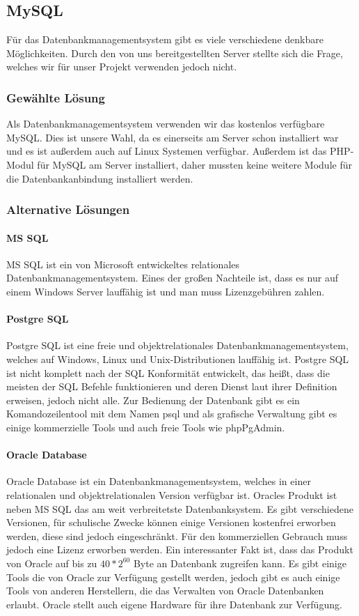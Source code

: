 \subsection{MySQL}
Für das Datenbankmanagementsystem gibt es viele verschiedene denkbare Möglichkeiten. Durch den von uns bereitgestellten Server stellte sich die Frage, welches wir für unser Projekt verwenden jedoch nicht.
\subsubsection{Gewählte Lösung}
Als Datenbankmanagementsystem verwenden wir das kostenlos verfügbare MySQL. Dies ist unsere Wahl, da es einerseits am Server schon installiert war und es ist außerdem auch auf Linux Systemen verfügbar. Außerdem ist das PHP-Modul für MySQL am Server installiert, daher mussten keine weitere Module für die Datenbankanbindung installiert werden.
\subsubsection{Alternative Lösungen} 
\paragraph{MS SQL}
MS SQL ist ein von Microsoft entwickeltes relationales Datenbankmanagementsystem. Eines der großen Nachteile ist, dass es nur auf einem Windows Server lauffähig ist und man muss Lizenzgebühren zahlen.
\paragraph{Postgre SQL}
Postgre SQL ist eine freie und objektrelationales Datenbankmanagementsystem, welches auf Windows, Linux und Unix-Distributionen lauffähig ist. Postgre SQL ist nicht komplett nach der SQL Konformität entwickelt, das heißt, dass die meisten der SQL Befehle funktionieren und deren Dienst laut ihrer Definition erweisen, jedoch nicht alle. Zur Bedienung der Datenbank gibt es ein Komandozeilentool mit dem Namen psql und als grafische Verwaltung gibt es einige kommerzielle Tools und auch freie Tools wie phpPgAdmin.
\paragraph{Oracle Database}
Oracle Database ist ein Datenbankmanagementsystem, welches in einer relationalen und objektrelationalen Version verfügbar ist. Oracles Produkt ist neben MS SQL das am weit verbreitetste Datenbanksystem. Es gibt verschiedene Versionen, für schulische Zwecke können einige Versionen kostenfrei erworben werden, diese sind jedoch eingeschränkt. Für den kommerziellen Gebrauch muss jedoch eine Lizenz erworben werden. Ein interessanter Fakt ist, dass das Produkt von Oracle auf bis zu $ 40 * 2^{60} $ Byte an Datenbank zugreifen kann. Es gibt einige Tools die von Oracle zur Verfügung gestellt werden, jedoch gibt es auch einige Tools von anderen Herstellern, die das Verwalten von Oracle Datenbanken erlaubt. Oracle stellt auch eigene Hardware für ihre Datenbank zur Verfügung.